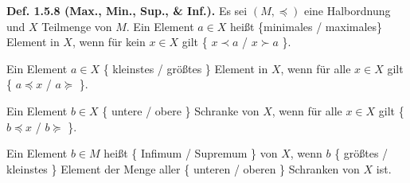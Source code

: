 \textbf{Def. 1.5.8 (Max., Min., Sup., \& Inf.).} Es sei $(M,\preceq)$ eine Halbordnung und $X$ Teilmenge von $M$. Ein Element $a\in X$ heißt \{minimales / maximales\} Element in $X$, wenn für kein $x\in X$ gilt \{ $x\prec a$ / $x \succ a$ \}.

Ein Element $a \in X$ \{ kleinstes / größtes \} Element in $X$, wenn für alle $x \in X$ gilt \{ $a \preceq x$ / $a \succeq$ \}.

Ein Element $b \in X$ \{ untere / obere \} Schranke von $X$, wenn für alle $x \in X$ gilt \{ $b \preceq x$ / $b \succeq$ \}.

Ein Element $ b \in M$ heißt \{ Infimum / Supremum \} von $X$, wenn $b$ \{ größtes / kleinstes \} Element der Menge aller \{ unteren / oberen \} Schranken von $X$ ist.

